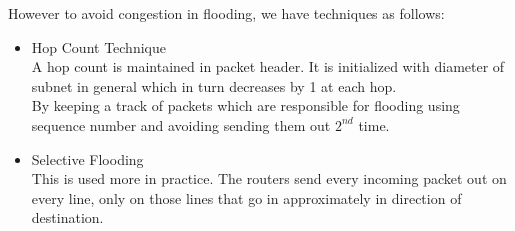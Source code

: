 \documentclass[12pt]{article}
\begin{document}
However to avoid congestion in flooding, we have techniques as follows:
\begin{itemize}
    \item Hop Count Technique \\
        A hop count is maintained in packet header. It is initialized with diameter of subnet in general which in turn decreases by 1 at each hop. \\
        By keeping a track of packets which are responsible for flooding using sequence number and avoiding sending them out $2^{nd}$ time.
    \item Selective Flooding \\
        This is used more in practice. The routers send every incoming packet out on every line, only on those lines that go in approximately in direction of destination. 
\end{itemize}
\end{document}
